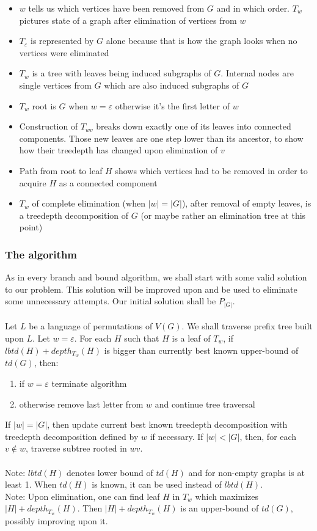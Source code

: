 \begin{itemize}
	\item $w$ tells us which vertices have been removed from $G$ and in which order. $T_w$ pictures state of a graph after elimination of vertices from $w$
	\item $T_\varepsilon$ is represented by $G$ alone because that is how the graph looks when no vertices were eliminated
	\item $T_w$ is a tree with leaves being induced subgraphs of $G$. Internal nodes are single vertices from $G$ which are also induced subgraphs of $G$
	\item $T_w$ root is $G$ when $w=\varepsilon$ otherwise it's the first letter of $w$
	\item Construction of $T_{wv}$ breaks down exactly one of its leaves into connected components. Those new leaves are one step lower than its ancestor, to show how their treedepth has changed upon elimination of $v$
	\item Path from  root to leaf $H$ shows which vertices had to be removed in order to acquire $H$ as a connected component
	\item $T_w$ of complete elimination (when $\left|w\right|=\left|G\right|$), after removal of empty leaves, is a treedepth decomposition of $G$ (or maybe rather an elimination tree at this point)
\end{itemize}
\subsubsection{The algorithm}
As in every branch and bound algorithm, we shall start with some valid solution to our problem. This solution will be improved upon and be used to eliminate some unnecessary attempts. Our initial solution shall be $P_{\left|G\right|}$.\\\\
Let $L$ be a language of permutations of $V\left(G\right)$. We shall traverse prefix tree built upon $L$.
Let $w=\varepsilon$. For each $H$ such that $H$ is a leaf of $T_w$, if $lbtd(H)+depth_{T_w}(H)$ is bigger than currently best known upper-bound of $td(G)$, then:
\begin{enumerate}
	\item if $w=\varepsilon$ terminate algorithm
	\item otherwise remove last letter from $w$ and continue tree traversal
\end{enumerate} If $|w|=|G|$, then update current best known treedepth decomposition with treedepth decomposition defined by $w$ if necessary. If $|w|<|G|$, then, for each $v\notin w$, traverse subtree rooted in $wv$.\\\\
Note: $lbtd(H)$ denotes lower bound of $td\left(H\right)$ and for non-empty graphs is at least 1. When $td\left(H\right)$ is known, it can be used instead of $lbtd(H)$.\\
Note: Upon elimination, one can find leaf $H$ in $T_w$ which maximizes $\left|H\right| + depth_{T_w}(H)$. Then $\left|H\right| + depth_{T_w}(H)$ is an upper-bound of $td(G)$, possibly improving upon it.
